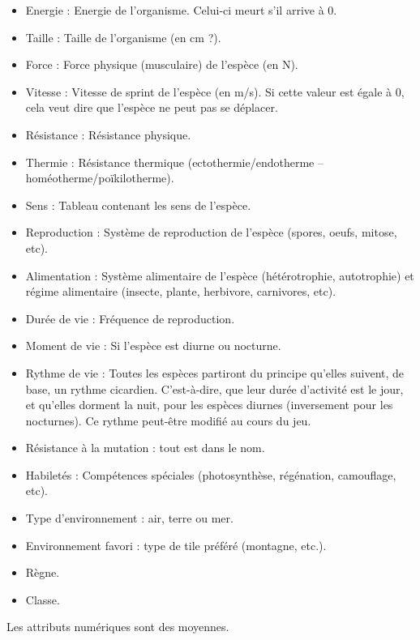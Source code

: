\begin{itemize}
	\item Energie : Energie de l'organisme. Celui-ci meurt s'il arrive à 0.
	\item Taille : Taille de l'organisme (en cm ?).
	\item Force : Force physique (musculaire) de l'espèce (en N).
	\item Vitesse : Vitesse de sprint de l'espèce (en m/s). Si cette valeur est égale à 0, cela veut dire que l'espèce ne peut pas se déplacer.
	\item Résistance : Résistance physique.
	\item Thermie : Résistance thermique (ectothermie/endotherme -- homéotherme/poïkilotherme).
	\item Sens : Tableau contenant les sens de l'espèce.
	\item Reproduction : Système de reproduction de l'espèce (spores, oeufs, mitose, etc).
	\item Alimentation : Système alimentaire de l'espèce (hétérotrophie, autotrophie) et régime alimentaire (insecte, plante, herbivore, carnivores, etc).
	\item Durée de vie : Fréquence de reproduction.
	\item Moment de vie : Si l'espèce est diurne ou nocturne.
	\item Rythme de vie : Toutes les espèces partiront du principe qu'elles suivent, de base, un rythme cicardien. C'est-à-dire, que leur durée d'activité est le jour, et qu'elles dorment la nuit, pour les espèces diurnes (inversement pour les nocturnes). Ce rythme peut-être modifié au cours du jeu.
	\item Résistance à la mutation : tout est dans le nom.
	\item Habiletés : Compétences spéciales (photosynthèse, régénation, camouflage, etc).
	\item Type d'environnement : air, terre ou mer.
	\item Environnement favori : type de tile préféré (montagne, etc.).
	\item Règne.
	\item Classe. 
\end{itemize}
Les attributs numériques sont des moyennes.